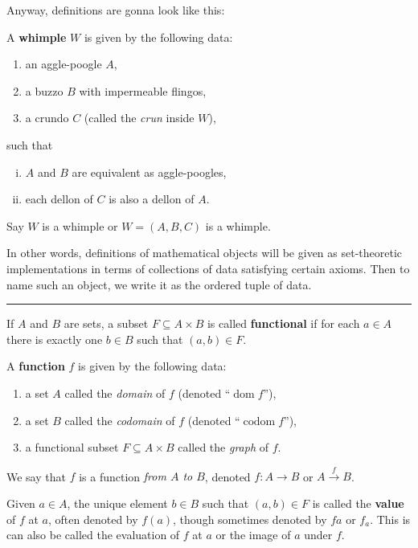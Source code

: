 \documentclass[12pt]{article}
\newlength{\myparskip}
\newenvironment{fullbox}{\begin{lrbox}{\savefullbox}\begin{minipage}{\dimexpr\textwidth-2\fboxsep\relax}\setlength{\parskip}{\myparskip}}{\end{minipage}\end{lrbox}\framebox[\textwidth]{\usebox{\savefullbox}}}
\newcommand{\keyword}[1]{\textbf{#1}}
\newcommand{\sepline}{\rule{\textwidth}{0.4pt}}
\theoremstyle{definition}
\newcommand{\<}{\left\langle}
\renewcommand{\>}{\right\rangle}
\newcommand{\seq}{\subseteq}
\DeclareMathOperator{\dom}{dom}
\DeclareMathOperator{\codom}{codom}
\begin{document}
Anyway, definitions are gonna look like this:

\begin{fullbox}
    A \keyword{whimple} $W$ is given by the following data:
    \begin{enumerate}[(1)]
        \item an aggle-poogle $A$,
        \item a buzzo $B$ with impermeable flingos,
        \item a crundo $C$ (called the \emph{crun} inside $W$),
    \end{enumerate}
    such that
    \begin{enumerate}[(i)]
        \item $A$ and $B$ are equivalent as aggle-poogles,
        \item each dellon of $C$ is also a dellon of $A$.
    \end{enumerate}
    Say $W$ is a whimple or $W = (A, B, C)$ is a whimple.
\end{fullbox}

In other words, definitions of mathematical objects will be given as set-theoretic implementations in terms of collections of data satisfying certain axioms.
Then to name such an object, we write it as the ordered tuple of data.

\sepline

If $A$ and $B$ are sets, a subset $F \seq A \times B$ is called \keyword{functional} if for each $a \in A$ there is exactly one $b \in B$ such that $(a, b) \in F$.

A \keyword{function} $f$ is given by the following data:
\begin{enumerate}[(1)]
    \item a set $A$ called the \emph{domain} of $f$ (denoted ``$\dom f$''),
    \item a set $B$ called the \emph{codomain} of $f$ (denoted ``$\codom f$''),
    \item a functional subset $F \seq A \times B$ called the \emph{graph} of $f$.
\end{enumerate}
We say that $f$ is a function \emph{from $A$ to $B$}, denoted $f : A \to B$ or $A \xrightarrow{f} B$.

Given $a \in A$, the unique element $b \in B$ such that $(a, b) \in F$ is called the \keyword{value} of $f$ at $a$, often denoted by $f(a)$, though sometimes denoted by $fa$ or $f_a$.
This is can also be called the evaluation of $f$ at $a$ or the image of $a$ under $f$.
\end{document}
